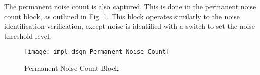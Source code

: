 \par The permanent noise count is also captured. This is done in the permanent noise count block, as outlined in Fig. \ref{fig:permanentNoiseCount}. This block operates similarly to the noise identification verification, except noise is identified with a switch to set the noise threshold level.
 \begin{figure}[H]
    \texttt{[image: impl\_dsgn\_Permanent Noise Count]}
    \caption{Permanent Noise Count Block}
    \label{fig:permanentNoiseCount}
\end{figure}